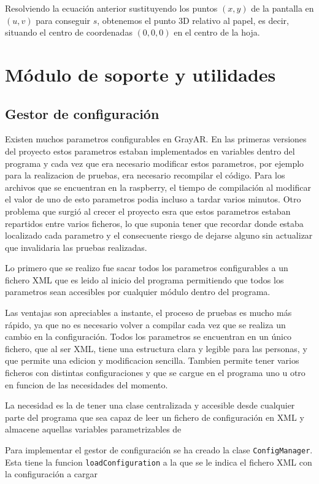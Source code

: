 Resolviendo la ecuación anterior sustituyendo los puntos $(x,y)$ de la
pantalla en $(u,v)$ para conseguir $s$, obtenemos el punto 3D relativo
al papel, es decir, situando el centro de coordenadas $(0,0,0)$ en el
centro de la hoja.



\section{Módulo de soporte y utilidades}
\subsection{Gestor de configuración}
Existen muchos parametros configurables en GrayAR. En las primeras versiones del proyecto estos parametros estaban implementados en variables dentro del programa y cada vez que era necesario modificar estos parametros, por ejemplo para la realizacion de pruebas, era necesario recompilar el código. Para los archivos que se encuentran en la raspberry, el tiempo de compilación al modificar el valor de uno de esto parametros podia incluso a tardar varios minutos. Otro problema que surgió al crecer el proyecto esra que estos parametros estaban repartidos entre varios ficheros, lo que suponia tener que recordar donde estaba localizado cada parametro y el consecuente riesgo de dejarse alguno sin actualizar que invalidaria las pruebas realizadas.

Lo primero que se realizo fue sacar todos los parametros configurables a un fichero \acs{XML} que es leido al inicio del programa permitiendo que todos los parametros sean accesibles por cualquier módulo dentro del programa.

Las ventajas son apreciables a instante, el proceso de pruebas es mucho más rápido, ya que no es necesario volver a compilar cada vez que se realiza un cambio en la configuración. Todos los parametros se encuentran en un único fichero, que al ser \acs{XML}, tiene una estructura clara y legible para las personas, y que permite una edicion y modificacion sencilla. Tambien permite tener varios ficheros con distintas configuraciones y que se cargue en el programa uno u otro en funcion de las necesidades del momento.
 
La necesidad es la de tener una clase centralizada y accesible desde cualquier parte del programa que sea capaz de leer un fichero de configuración en \acs{XML} y almacene aquellas variables parametrizables de

Para implementar el gestor de configuración se ha creado la clase  \texttt{ConfigManager}. Esta tiene la funcion  \texttt{loadConfiguration} a la que se le indica el fichero \acs{XML} con la configuración a cargar 

